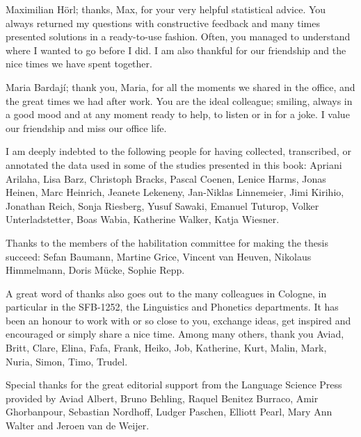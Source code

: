 Maximilian Hörl; thanks, Max, for your very helpful statistical advice. You always returned my questions with constructive feedback and many times presented solutions in a ready-to-use fashion. Often, you managed to understand where I wanted to go before I did. I am also thankful for our friendship and the nice times we have spent together.

Maria Bardají; thank you, Maria, for all the moments we shared in the office, and the great times we had after work. You are the ideal colleague; smiling, always in a good mood and at any moment ready to help, to listen or in for a joke. I value our friendship and miss our office life.

I am deeply indebted to the following people for having collected, transcribed, or annotated the data used in some of the studies presented in this book: Apriani Arilaha, Lisa Barz, Christoph Bracks, Pascal Coenen, Lenice Harms, Jonas Heinen, Marc Heinrich, Jeanete Lekeneny, Jan-Niklas Linnemeier, Jimi Kirihio, Jonathan Reich, Sonja Riesberg, Yusuf Sawaki, Emanuel Tuturop, Volker Unterladstetter, Boas Wabia, Katherine Walker, Katja Wiesner.

Thanks to the members of the habilitation committee for making the thesis succeed: Sefan Baumann, Martine Grice, Vincent van Heuven, Nikolaus Himmelmann, Doris Mücke, Sophie Repp.

A great word of thanks also goes out to the many colleagues in Cologne, in particular in the SFB-1252, the Linguistics and Phonetics departments. It has been an honour to work with or so close to you, exchange ideas, get inspired and encouraged or simply share a nice time. Among many others, thank you Aviad, Britt, Clare, Elina, Fafa, Frank, Heiko, Job, Katherine, Kurt, Malin, Mark, Nuria, Simon, Timo, Trudel.

Special thanks for the great editorial support from the Language Science Press provided by Aviad Albert, Bruno Behling, Raquel Benitez Burraco, Amir Ghorbanpour, Sebastian Nordhoff, Ludger Paschen, Elliott Pearl, Mary Ann Walter and Jeroen van de Weijer.
